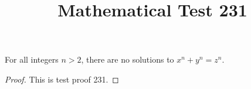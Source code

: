 \documentclass{amsart}
\begin{document}
\title{Mathematical Test 231}
\begin{theorem}
For all integers $n > 2$, there are no solutions to $x^n + y^n = z^n$.
\end{theorem}
\begin{proof}
This is test proof 231.
\end{proof}
\end{document}
